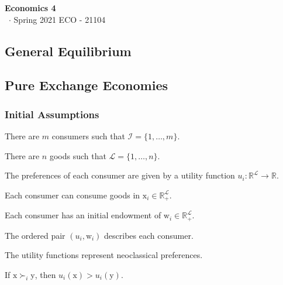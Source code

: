 \documentclass[8pt,a4paper]{extarticle}
\renewcommand{\csClass}{Economics 4}
\renewcommand{\csClassCode}{ECO - 21104}
\renewcommand{\csTerm}{Spring 2021}
\begin{document}
\begin{titlepage}
  \begin{center}
    \vspace*{1cm}
    \Huge
    \textbf{\csClass}
    \vspace{0.5cm} \\
    \Large
    \cs\ $\cdot$ \csTerm
    \vfill
    \csAuthorName
    \vspace{0.8cm}
    \csClassCode\\
    \csSchool
  \end{center}
\end{titlepage}

\begin{multicols}{3}
  \setcounter{page}{1}

  \section{General Equilibrium}

  \subsection{Pure Exchange Economies}

  \subsubsection*{Initial Assumptions}

  \begin{bulletlist}
    \item There are $m$ consumers such that $\mathcal{I} = \{1, \ldots, m\}$.
    \item There are $n$ goods such that $\mathcal{L} = \{1, \ldots, n\}$.
    \item The preferences of each consumer are given by a utility function $u_i : \mathbb{R}^\mathcal{L} \to \mathbb{R}$.
    \item Each consumer can consume goods in $\mathrm{x}_i \in \mathbb{R}_+^\mathcal{L}$.
    \item Each consumer has an initial endowment of $\mathrm{w}_i \in \mathbb{R}_+^\mathcal{L}$.
    \item The ordered pair $(u_i, \mathrm{w}_i)$ describes each consumer.
    \item The utility functions represent neoclassical preferences.
  \end{bulletlist}

  \begin{boxprop}
    If $\mathrm{x} \succ_i \mathrm{y}$, then $u_i(\mathrm{x}) > u_i(\mathrm{y})$.
  \end{boxprop}


\end{multicols}
\end{document}

